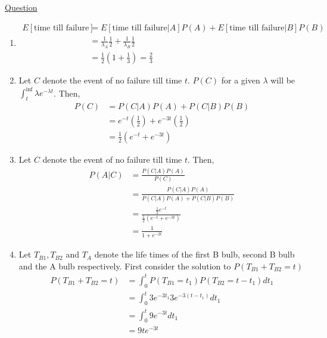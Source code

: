 \documentclass[11pt, a4paper]{article}
\begin{document}
\begin{enumerate}
        
        \hypertarget{a_poissonbulb2}{\item} \hyperlink{q_poissonbulb2}{Question}\newline
        \begin{enumerate}
            \item 
            \begin{align*}
                E[\text{time till failure}] &= E[\text{time till failure}|A]P(A) + E[\text{time till failure}|B]P(B)\\
                &= \frac{1}{\lambda_{A}} \frac{1}{2} + \frac{1}{\lambda_{B}} \frac{1}{2}\\
                &= \frac{1}{2}(1 + \frac{1}{3}) = \frac{2}{3}
            \end{align*}

            \item Let $C$ denote the event of no failure till time $t$. $P(C)$ for a given $\lambda$ will be $\int_{t}^{\inf} \lambda e^{-\lambda t}$. Then,
            \begin{align*}
                P(C) &= P(C|A)P(A) + P(C|B)P(B) \tag*{Using total probability theorem}\\
                     &= e^{-t}(\frac{1}{2}) + e^{-3t}(\frac{1}{2})\\
                     &= \frac{1}{2}(e^{-t} + e^{-3t})
            \end{align*}

            \item \label{itm:a_poissonbulb2_c} Let $C$ denote the event of no failure till time $t$. Then,
            \begin{align*}
                P(A|C) &= \frac{P(C|A)P(A)}{P(C)}\\
                       &= \frac{P(C|A)P(A)}{P(C|A)P(A) + P(C|B)P(B)}\\
                       &= \frac{\frac{1}{2} e^{-t}}{\frac{1}{2}(e^{-t} + e^{-3t})}\\
                       &= \frac{1}{1 + e^{-2t}}
            \end{align*}

            \item Let $T_{B1}, T_{B2}$ and $T_{A}$ denote the life times of the first B bulb, second B bulb and the A bulb respectively. First consider the solution to $P(T_{B1} + T_{B2} = t)$
            \begin{align*}
                P(T_{B1} + T_{B2} = t) &= \int_{0}^{t} P(T_{B1} = t_{1})P(T_{B2} = t - t_{1}) dt_{1} \tag*{Using independence}\\
                &= \int_{0}^{t} 3e^{-3t_{1}} 3e^{-3(t - t_{1})} dt_{1}\\
                &= \int_{0}^{t} 9e^{-3t}dt_{1}\\
                &= 9te^{-3t}
            \end{align*}
            

\end{enumerate}
\end{enumerate}
\end{document}
